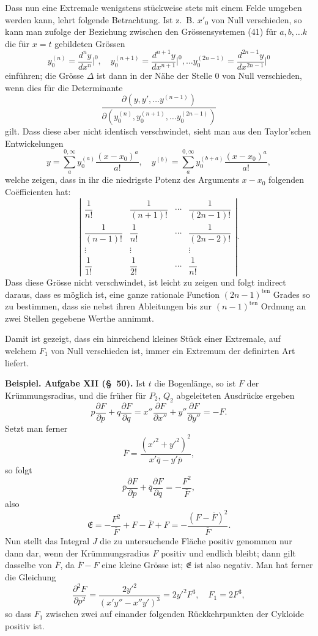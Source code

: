 \documentclass[11pt,a4paper,leqno]{article}
\begin{document}
Dass nun eine Extremale wenigstens stückweise stets mit einem Felde umgeben werden kann, lehrt folgende Betrachtung. Ist z.~B. $x'_0$ von Null verschieden, so kann man zufolge der Beziehung zwischen den Grössensystemen (41) für $a,b,\ldots k$ die für $x=t$ gebildeten Grössen
\[
y_0^{(n)}=\frac{d^ny}{dx^n}\bigg|^0,\quad
y_0^{(n+1)}=\frac{d^{n+1}y}{dx^{n+1}}\bigg|^0,\ldots
y_0^{(2n-1)}=\frac{d^{2n-1}y}{dx^{2n-1}}\bigg|^0
\]
einführen; die Grösse $\Delta$ ist dann in der Nähe der Stelle 0 von Null verschieden, wenn dies für die Determinante
\[
\frac{\partial(y,y',\ldots y^{(n-1)})}
{\partial(y_0^{(n)},y_0^{(n+1)},\ldots y_0^{(2n-1)})}
\]
gilt. Dass diese aber nicht identisch verschwindet, sieht man aus den Taylor'schen Entwickelungen
\[
y=\sum_a^{0,\infty}y_0^{(a)}\frac{(x-x_0)^a}{a!},\quad
y^{(b)}=\sum_a^{0,\infty}y_0^{(b+a)}\frac{(x-x_0)^a}{a!},
\]
welche zeigen, dass in ihr die niedrigste Potenz des Arguments $x-x_0$ folgenden Coëfficienten hat:
\[
\left|
\begin{array}{cccc}
\dfrac1{n!}&\dfrac1{(n+1)!}&\cdots&\dfrac1{(2n-1)!}\\[2mm]
\dfrac1{(n-1)!}&\dfrac1{n!}&\cdots&\dfrac1{(2n-2)!}\\
\vdots&\vdots&&\vdots\\
\dfrac1{1!}&\dfrac1{2!}&\cdots&\dfrac1{n!}
\end{array}
\right|.
\]
Dass diese Grösse nicht verschwindet, ist leicht zu zeigen und folgt indirect daraus, dass es möglich ist, eine ganze rationale Function $(2n-1)^{\mathrm{ten}}$ Grades so zu bestimmen, dass sie nebst ihren Ableitungen bis zur $(n-1)^{\mathrm{ten}}$ Ordnung an zwei Stellen gegebene Werthe annimmt.

Damit ist gezeigt, dass ein hinreichend kleines Stück einer Extremale, auf welchem $F_1$ von Null verschieden ist, immer ein Extremum der definirten Art liefert.

\noindent\textbf{Beispiel. Aufgabe XII (\S~50).} Ist $t$ die Bogenlänge, so ist $F$ der Krümmungsradius, und die früher für $P_2$, $Q_2$ abgeleiteten Ausdrücke ergeben
\[
p\frac{\partial F}{\partial p}+q\frac{\partial F}{\partial q}
=x''\frac{\partial F}{\partial x''}+y''\frac{\partial F}{\partial y''}=-F.
\]
Setzt man ferner
\[
\overline{F}=\frac{(x'^2+y'^2)^2}{x'\overline{q}-y'\overline{p}},
\]
so folgt
\[
\overline{p}\frac{\partial F}{\partial p}
+\overline{q}\frac{\partial F}{\partial q}
=-\frac{F^2}{\overline{F}},
\]
also
\[
\mathfrak{E}=-\frac{F^2}{\overline{F}}+F-\overline{F}+F
=-\frac{(F-\overline{F})^2}{\overline{F}}.
\]
Nun stellt das Integral $J$ die zu untersuchende Fläche positiv genommen nur dann dar, wenn der Krümmungsradius $F$ positiv und endlich bleibt; dann gilt dasselbe von $\overline{F}$, da $\overline{F}-F$ eine kleine Grösse ist; $\mathfrak{E}$ ist also negativ. Man hat ferner die Gleichung
\[
\frac{\partial^2F}{\partial p^2}
=\frac{2y'^2}{(x'y''-x''y')^3}
=2y'^2F^3,\quad F_1=2F^3,
\]
so dass $F_1$ zwischen zwei auf einander folgenden Rückkehrpunkten der Cykloide positiv ist.
\end{document}
